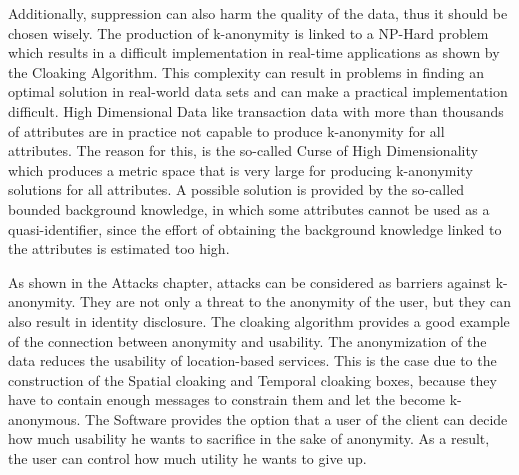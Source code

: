 \documentclass{llncs}
\begin{document}
Additionally, suppression can also harm the quality of the data, thus it should be chosen wisely. The production of k-anonymity is linked to a NP-Hard problem which results in a difficult implementation in real-time applications as shown by the Cloaking Algorithm. This complexity can result in problems in finding an optimal solution in real-world data sets and can make a practical implementation difficult. High Dimensional Data like transaction data with more than thousands of attributes are in practice not capable to produce k-anonymity for all attributes. The reason for this, is the so-called Curse of High Dimensionality which produces a metric space that is very large for producing k-anonymity solutions for all attributes. A possible solution is provided by the so-called bounded background knowledge, in which some attributes cannot be used as a quasi-identifier, since the effort of obtaining the background knowledge linked to the attributes is estimated too high.  

As shown in the Attacks chapter, attacks can be considered as barriers against k-anonymity. They are not only a threat to the anonymity of the user, but they can also result in identity disclosure. The cloaking algorithm provides a good example of the connection between anonymity and usability. The anonymization of the data reduces the usability of location-based services. This is the case due to the construction of the Spatial cloaking and Temporal cloaking boxes, because they have to contain enough messages to constrain them and let the become k-anonymous. The Software provides the option that a user of the client can decide how much usability he wants to sacrifice in the sake of anonymity. As a result, the user can control how much utility he wants to give up.

\newpage


\end{document}
